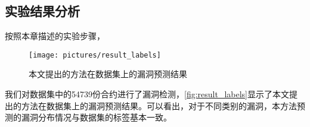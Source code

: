 \subsection{实验结果分析}
\label{sec:实验结果分析}
按照本章描述的实验步骤，
\begin{figure}[htbp]
    \centering
    \texttt{[image: pictures/result\_labels]}
    \caption{\label{fig:result_labels}本文提出的方法在数据集上的漏洞预测结果}
\end{figure}
我们对数据集中的54739份合约进行了漏洞检测，\autoref{fig:result_labels}显示了本文提出的方法在数据集上的漏洞预测结果。可以看出，对于不同类别的漏洞，本方法预测的漏洞分布情况与数据集的标签基本一致。


